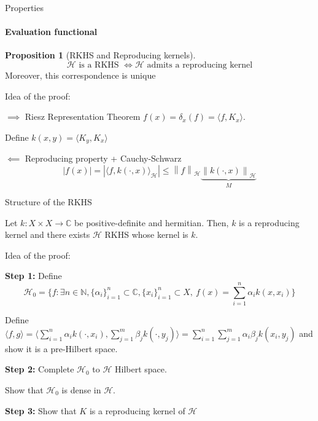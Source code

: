 \documentclass[10pt]{beamer}
\theoremstyle{definition} %
\newtheorem*{proposition}{Proposition} %
\newcommand{\norm}[1]{\left\lVert#1\right\rVert}
\begin{document}
\begin{frame}{Properties}
\framesubtitle{Evaluation functional}

\begin{proposition}[RKHS and Reproducing kernels]
$$\mathcal{H} \text{ is a RKHS } \iff \mathcal{H} \text{ admits a reproducing kernel}$$
Moreover, this correspondence is unique
\end{proposition}
{\setlength{\parskip}{1pt}
Idea of the proof:

$\implies$ Riesz Representation Theorem $f(x) = \delta_x(f) = \langle f, K_x \rangle$.

Define $k(x,y) = \langle K_y, K_x\rangle$

$\impliedby$ Reproducing property + Cauchy-Schwarz
\[
|f(x)| =|\langle f, k(\cdot, x) \rangle_\mathcal{H}| \leq \norm{f}_\mathcal{H} \underbrace{\norm{k(\cdot, x)}_\mathcal{H}}_{M}
\]
}

\end{frame}
\begin{frame}{Structure of the RKHS}
\begin{theorem}
Let $k: X \times X \to \mathbb{C}$ be positive-definite and hermitian. Then, $k$ is a reproducing kernel and there exists $\mathcal{H}$ RKHS whose kernel is $k$.
\end{theorem}
{\setlength{\parskip}{1pt}
Idea of the proof:

\textbf{Step 1:} Define $$\mathcal{H}_0 = \{f : \exists n \in \mathbb{N}, \{\alpha_i\}_{i=1}^n \subset \mathbb{C}, \{x_i\}_{i=1}^n \subset X, \ f(x) = \sum_{i=1}^n \alpha_i k(x, x_i)\}$$

Define $\langle f, g \rangle = \langle \sum_{i=1}^n \alpha_i k(\cdot, x_i), \sum_{j=1}^m \beta_j k(\cdot, y_j) \rangle = \sum_{i=1}^n \sum_{j=1}^m \alpha_i \beta_j k(x_i, y_j)$  and show it is a pre-Hilbert space.

\textbf{Step 2:}
Complete $\mathcal{H}_0$ to $\mathcal{H}$ Hilbert space.

Show that $\mathcal{H}_0$ is dense in $\mathcal{H}$.

\textbf{Step 3:}
Show that $K$ is a reproducing kernel of $\mathcal{H}$
}
\end{frame}
\end{document}
